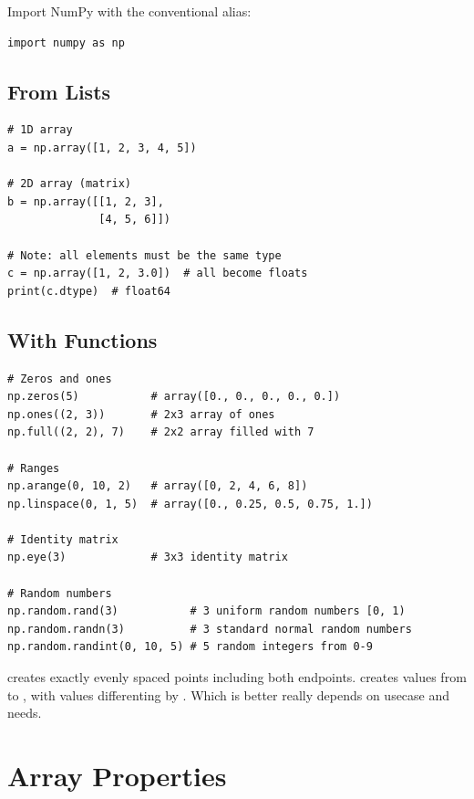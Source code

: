 Import NumPy with the conventional alias:

\begin{lstlisting}
import numpy as np
\end{lstlisting}

\subsection{From Lists}

\begin{lstlisting}
# 1D array
a = np.array([1, 2, 3, 4, 5])

# 2D array (matrix)
b = np.array([[1, 2, 3],
              [4, 5, 6]])

# Note: all elements must be the same type
c = np.array([1, 2, 3.0])  # all become floats
print(c.dtype)  # float64
\end{lstlisting}

\subsection{With Functions}

\begin{lstlisting}
# Zeros and ones
np.zeros(5)           # array([0., 0., 0., 0., 0.])
np.ones((2, 3))       # 2x3 array of ones
np.full((2, 2), 7)    # 2x2 array filled with 7

# Ranges
np.arange(0, 10, 2)   # array([0, 2, 4, 6, 8])
np.linspace(0, 1, 5)  # array([0., 0.25, 0.5, 0.75, 1.])

# Identity matrix
np.eye(3)             # 3x3 identity matrix

# Random numbers
np.random.rand(3)           # 3 uniform random numbers [0, 1)
np.random.randn(3)          # 3 standard normal random numbers
np.random.randint(0, 10, 5) # 5 random integers from 0-9
\end{lstlisting}

\begin{tip}
 creates exactly  evenly spaced points including both endpoints.  creates values from  to , with values differenting by . Which is better really depends on usecase and needs.
\end{tip}

\section{Array Properties}
\label{sec:array-properties}

